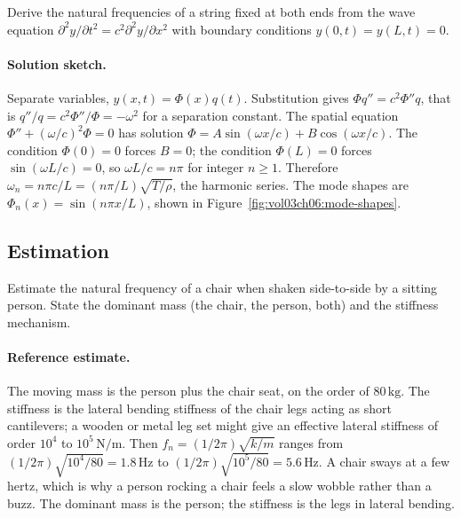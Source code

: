 \begin{exercise}
Derive the natural frequencies of a string fixed at both ends from
the wave equation $\partial^2 y/\partial t^2 = c^2 \partial^2 y/
\partial x^2$ with boundary conditions $y(0, t) = y(L, t) = 0$.

\paragraph{Solution sketch.} Separate variables, $y(x, t) =
\Phi(x)q(t)$. Substitution gives $\Phi q'' = c^2\Phi'' q$, that is
$q''/q = c^2\Phi''/\Phi = -\omega^2$ for a separation constant. The
spatial equation $\Phi'' + (\omega/c)^2\Phi = 0$ has solution $\Phi =
A\sin(\omega x/c) + B\cos(\omega x/c)$. The condition $\Phi(0) = 0$
forces $B = 0$; the condition $\Phi(L) = 0$ forces $\sin(\omega L/c)
= 0$, so $\omega L/c = n\pi$ for integer $n \geq 1$. Therefore
$\omega_n = n\pi c/L = (n\pi/L)\sqrt{T/\rho}$, the harmonic series.
The mode shapes are $\Phi_n(x) = \sin(n\pi x/L)$, shown in
Figure~\ref{fig:vol03ch06:mode-shapes}.
\end{exercise}

\subsection*{Estimation}

\begin{exercise}
Estimate the natural frequency of a chair when shaken side-to-side
by a sitting person. State the dominant mass (the chair, the
person, both) and the stiffness mechanism.

\paragraph{Reference estimate.} The moving mass is the person plus the
chair seat, on the order of $80\,\si{\kilogram}$. The stiffness is the
lateral bending stiffness of the chair legs acting as short
cantilevers; a wooden or metal leg set might give an effective lateral
stiffness of order $10^4$ to $10^5\,\si{\newton\per\meter}$. Then
$f_n = (1/2\pi)\sqrt{k/m}$ ranges from $(1/2\pi)\sqrt{10^4/80} =
1.8\,\si{\hertz}$ to $(1/2\pi)\sqrt{10^5/80} = 5.6\,\si{\hertz}$. A
chair sways at a few hertz, which is why a person rocking a chair
feels a slow wobble rather than a buzz. The dominant mass is the
person; the stiffness is the legs in lateral bending.
\end{exercise}

